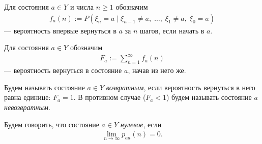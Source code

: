 \documentclass[../main.tex]{subfiles}
\begin{document}
\begin{notatn*}
 Для состояния $ a \in Y $ и числа $ n \geqslant 1 $ обозначим
 \begin{align*}
  f_a(n) := P(\xi_n=a\mid \xi_{n-1} \neq a,\; \ldots,\; \xi_1 \neq a,\; \xi_0 = a)
 \end{align*} --- вероятность впервые вернуться в $ a $ за $ n $ шагов, если начать в $ a $.
\end{notatn*}

\begin{notatn*}
 Для состояния $ a\in Y $ обозначим
 \begin{align*}
  F_a := \sum_{n=1}^{\infty} f_a(n)
 \end{align*} --- вероятность вернуться в состояние $ a $, начав из него же.
\end{notatn*}

\begin{df}
 Будем называть состояние $ a \in Y $ \textit{возвратным}, если вероятность вернуться в него равна единице: $ F_a = 1 $. В противном случае ($ F_a < 1 $) будем называть состояние $ a $  \textit{невозвратным}.
\end{df}

\begin{df}
 Будем говорить, что состояние $ a \in Y $ \textit{нулевое}, если
 \begin{align*}
  \lim_{n \to \infty} p_{aa}(n)  = 0.
 \end{align*}
\end{df}
\end{document}
